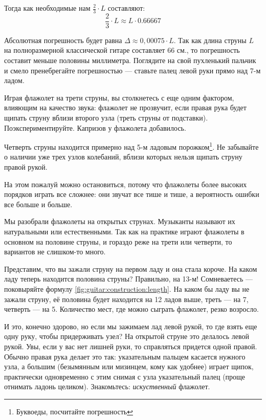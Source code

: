 Тогда как необходимые нам $\frac{2}{3}\cdot L$ составляют:
\[
    \frac{2}{3}\cdot L \approx L\cdot 0.66667
\]

Абсолютная погрешность будет равна $\Delta \approx 0,00075 \cdot L$. Так как длина струны $L$ на полноразмерной классической гитаре составляет $66$ см., то погрешность составит меньше половины миллиметра. Поглядите на свой пухленький пальчик и смело пренебрегайте погрешностью --- ставьте палец левой руки прямо над 7-м ладом.

Играя флажолет на трети струны, вы столкнетесь с еще одним фактором, влияющим на качество звука: флажолет не прозвучит, если правая рука будет щипать струну вблизи второго узла (треть струны от подставки). Поэкспериментируйте. Капризов у флажолета добавилось.

Четверть струны находится примерно над 5-м ладовым порожком\footnote{Буквоеды, посчитайте погрешность}. Не забывайте о наличии уже трех узлов колебаний, вблизи которых нельзя щипать струну правой рукой.

На этом пожалуй можно остановиться, потому что флажолеты более высоких порядков играть все сложнее: они звучат все тише и тише, а вероятность ошибки все больше и больше.

Мы разобрали флажолеты на открытых струнах. Музыканты называют их натуральными или естественными. Так как на практике играют флажолеты в основном на половине струны, и гораздо реже на трети или четверти, то вариантов не слишком-то много.

Представим, что вы зажали струну на первом ладу и она стала короче. На каком ладу теперь находится половина струны? Правильно, на 13-м! Сомневаетесь --- поковыряйте формулу \ref{fig:guitar:construction:length}. На каком бы ладу вы не зажали струну, её половина будет находится на 12 ладов выше, треть --- на 7, четверть --- на 5. Количество мест, где можно сыграть флажолет, резко возросло.

И это, конечно здорово, но если мы зажимаем лад левой рукой, то где взять еще одну руку, чтобы придерживать узел? На открытой струне это делалось левой рукой. Увы, если у вас нет лишней руки, то справляться придется одной правой. Обычно правая рука делает это так: указательным пальцем касается нужного узла, а большим (безымянным или мизинцем, кому как удобнее) играет щипок, практически одновременно с этим снимая с узла указательный палец (проще отнимать ладонь целиком). Знакомьтесь: \emph{искуственный} флажолет.

